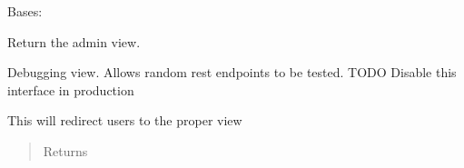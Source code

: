 \documentclass[letterpaper,10pt,english]{sphinxmanual}
\begin{document}
\begin{fulllineitems}
\label{\detokenize{apidoc/utdesign_procurement:utdesign_procurement.server.Root}}
Bases: {\hyperref[\detokenize{apidoc/utdesign_procurement:utdesign_procurement.apigateway.ApiGateway}]{}}

\begin{fulllineitems}
\label{\detokenize{apidoc/utdesign_procurement:utdesign_procurement.server.Root.admin}}
Return the admin view.

\end{fulllineitems}


\begin{fulllineitems}
\label{\detokenize{apidoc/utdesign_procurement:utdesign_procurement.server.Root.debug}}
Debugging view. Allows random rest endpoints to be tested.
TODO Disable this interface in production

\end{fulllineitems}


\begin{fulllineitems}
\label{\detokenize{apidoc/utdesign_procurement:utdesign_procurement.server.Root.index}}
This will redirect users to the proper view
\begin{quote}\begin{description}
\item[{Returns}] \leavevmode


\end{description}\end{quote}

\end{fulllineitems}


\end{fulllineitems}
\end{document}
